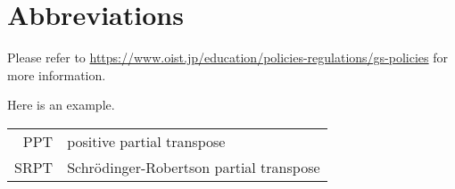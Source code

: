 \chapter*{Abbreviations}

Please refer to \url{https://www.oist.jp/education/policies-regulations/gs-policies} for more information.

Here is an example.

\begin{longtable}{rl}
    PPT  & positive partial transpose                \\
    SRPT & Schr\"odinger-Robertson partial transpose
\end{longtable}
